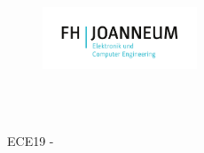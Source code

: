 \begin{titlepage}
    \begin{figure}[h]
        \raggedleft
        \includegraphics[height=5em]{assets/pictures/fh-logo.pdf}
    \end{figure}

    \vspace*{5cm}
    \begin{center}
        \Huge{\textbf{\lecture}}\\
        \LARGE{\documenTitle}\\
        \vspace{6pt}
    \end{center}

    \vspace*{\fill}
    \noindent\large{ECE19 - \semester~\firstStudent~\\\secondStudent~\\
    \lectureDate}




\end{titlepage}
